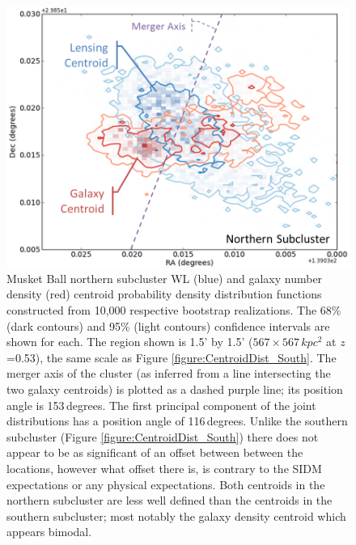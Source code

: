 \begin{figure}
\centering
\includegraphics[width=5in]{Chapter4/AnalysisFiles/northcentroids_histplot2d_reformat.png}
\caption[Musket Ball northern subcluster galaxy and weak lensing centroid spatial distribution.]{
Musket Ball northern subcluster WL (blue) and galaxy number density (red) centroid probability density distribution functions constructed from 10,000 respective bootstrap realizations.
The 68\% (dark contours) and 95\% (light contours) confidence intervals are shown for each.
The region shown is 1.5' by 1.5' ($567\times 567\,kpc^2$ at $z$=0.53), the same scale as Figure \ref{figure:CentroidDist_South}.
The merger axis of the cluster (as inferred from a line intersecting the two galaxy centroids) is plotted as a dashed purple line; its position angle is 153\,degrees.
The first principal component of the joint distributions has a position angle of 116\,degrees.
Unlike the southern subcluster (Figure \ref{figure:CentroidDist_South}) there does not appear to be as significant of an offset between between the locations, however what offset there is, is contrary to the SIDM expectations or any physical expectations.
Both centroids in the northern subcluster are less well defined than the centroids in the southern subcluster; most notably the galaxy density centroid which appears bimodal.
}
\label{figure:CentroidDist_North}
\end{figure}

